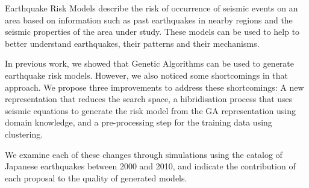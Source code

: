 Earthquake Risk Models describe the risk of occurrence of seismic
events on an area based on information such as past earthquakes
in nearby regions and the seismic properties of the area under study.
These models can be used to help to better understand earthquakes,
their patterns and their mechanisms.

In previous work, we showed that Genetic Algorithms can be used to
generate earthquake risk models. However, we also noticed some
shortcomings in that approach. We propose three improvements to
address these shortcomings: A new representation that reduces the
search space, a hibridisation process that uses seismic equations to
generate the risk model from the GA representation using domain
knowledge, and a pre-processing step for the training data using
clustering.

We examine each of these changes through simulations using the catalog
of Japanese earthquakes between 2000 and 2010, and indicate the
contribution of each proposal to the quality of generated models.
